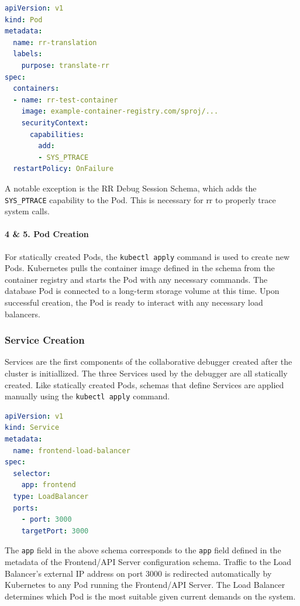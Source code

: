 \documentclass[12pt]{article}
\begin{document}
\begin{lstlisting}[language=YAML,basicstyle=\linespread{0.5}\ttfamily,caption={RR Debug Session Schema},captionpos=b]
apiVersion: v1
kind: Pod
metadata:
  name: rr-translation
  labels:
    purpose: translate-rr
spec:
  containers:
  - name: rr-test-container
    image: example-container-registry.com/sproj/...
    securityContext:
      capabilities:
        add:
        - SYS_PTRACE
  restartPolicy: OnFailure
\end{lstlisting}

A notable exception is the RR Debug Session Schema, which adds the
\lstinline{SYS_PTRACE} capability to the Pod.  This is necessary for
rr to properly trace system calls.

\paragraph{4 \& 5. Pod Creation}

For statically created Pods, the \lstinline{kubectl apply} command is
used to create new Pods.  Kubernetes pulls the container image defined
in the schema from the container registry and starts the Pod with any
necessary commands.  The database Pod is connected to a long-term
storage volume at this time.  Upon successful creation, the Pod is
ready to interact with any necessary load balancers.

\subsubsection{Service Creation}

Services are the first components of the collaborative debugger
created after the cluster is initiallized.  The three Services used by
the debugger are all statically created.  Like statically created
Pods, schemas that define Services are applied manually using the
\lstinline{kubectl apply} command.

\begin{lstlisting}[language=YAML,basicstyle=\linespread{0.5}\ttfamily,caption={Frontend Load Balancer Schema},captionpos=b]
apiVersion: v1
kind: Service
metadata:
  name: frontend-load-balancer
spec:
  selector:
    app: frontend
  type: LoadBalancer
  ports:
    - port: 3000
    targetPort: 3000
\end{lstlisting}

The \lstinline{app} field in the above schema corresponds to the
\lstinline{app} field defined in the metadata of the Frontend/API
Server configuration schema.  Traffic to the Load Balancer's external
IP address on port 3000 is redirected automatically by Kubernetes to
any Pod running the Frontend/API Server.  The Load Balancer determines
which Pod is the most suitable given current demands on the system.
\end{document}
